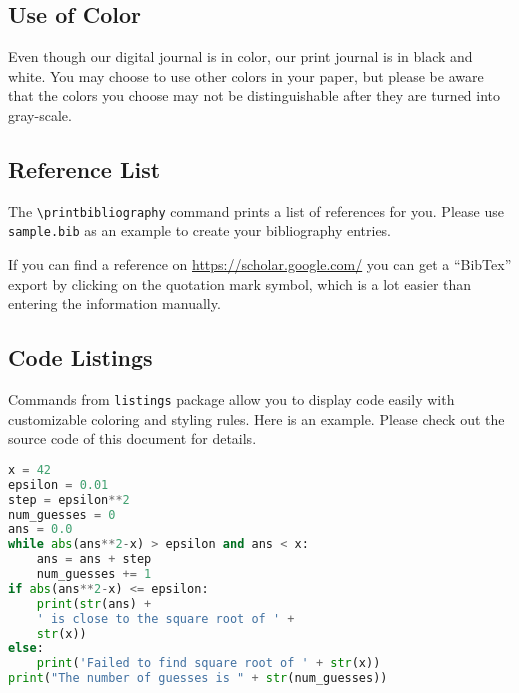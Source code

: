 \documentclass{article}
\begin{document}
\subsection{Use of Color}
Even though our digital journal is in color, our print journal is in black and white.
You may choose to use other colors in your paper, but please be aware that the colors
you choose may not be distinguishable after they are turned into gray-scale.

\subsection{Reference List}
The \verb+\printbibliography+ command prints a list of references for you.
Please use \texttt{sample.bib} as an example to create your bibliography entries.

If you can find a reference on \url{https://scholar.google.com/} you can get a
``BibTex'' export by clicking on the quotation mark symbol, which is a lot easier
than entering the information manually.

\subsection{Code Listings}
Commands from \texttt{listings} package allow you to display code easily with
customizable coloring and styling rules. Here is an example.
Please check out the source code of this document for details.

\begin{lstlisting}[language=Python,  caption=Python example]
x = 42
epsilon = 0.01
step = epsilon**2
num_guesses = 0
ans = 0.0
while abs(ans**2-x) > epsilon and ans < x:
    ans = ans + step
    num_guesses += 1
if abs(ans**2-x) <= epsilon:
    print(str(ans) +
    ' is close to the square root of ' +
    str(x))
else:
    print('Failed to find square root of ' + str(x))
print("The number of guesses is " + str(num_guesses))
\end{lstlisting}
\end{document}
